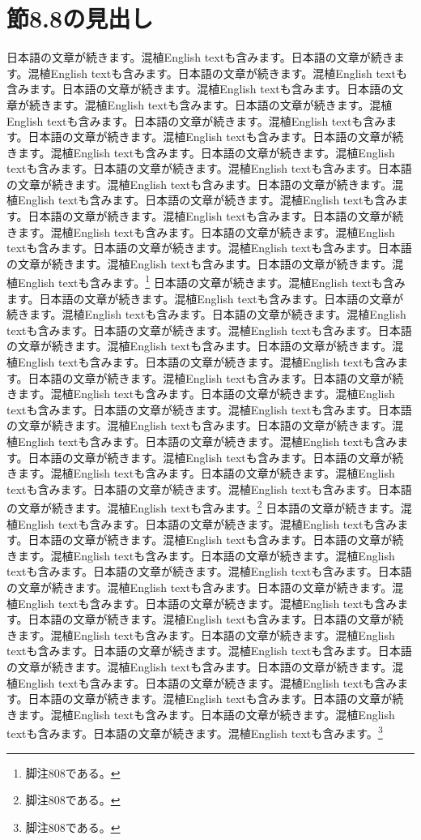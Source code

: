 \documentclass[pdflatex,book]{jlreq}
\begin{document}
\section{節8.8の見出し}
日本語の文章が続きます。混植English textも含みます。日本語の文章が続きます。混植English textも含みます。日本語の文章が続きます。混植English textも含みます。日本語の文章が続きます。混植English textも含みます。日本語の文章が続きます。混植English textも含みます。日本語の文章が続きます。混植English textも含みます。日本語の文章が続きます。混植English textも含みます。日本語の文章が続きます。混植English textも含みます。日本語の文章が続きます。混植English textも含みます。日本語の文章が続きます。混植English textも含みます。日本語の文章が続きます。混植English textも含みます。日本語の文章が続きます。混植English textも含みます。日本語の文章が続きます。混植English textも含みます。日本語の文章が続きます。混植English textも含みます。日本語の文章が続きます。混植English textも含みます。日本語の文章が続きます。混植English textも含みます。日本語の文章が続きます。混植English textも含みます。日本語の文章が続きます。混植English textも含みます。日本語の文章が続きます。混植English textも含みます。日本語の文章が続きます。混植English textも含みます。\footnote{脚注808である。}
日本語の文章が続きます。混植English textも含みます。日本語の文章が続きます。混植English textも含みます。日本語の文章が続きます。混植English textも含みます。日本語の文章が続きます。混植English textも含みます。日本語の文章が続きます。混植English textも含みます。日本語の文章が続きます。混植English textも含みます。日本語の文章が続きます。混植English textも含みます。日本語の文章が続きます。混植English textも含みます。日本語の文章が続きます。混植English textも含みます。日本語の文章が続きます。混植English textも含みます。日本語の文章が続きます。混植English textも含みます。日本語の文章が続きます。混植English textも含みます。日本語の文章が続きます。混植English textも含みます。日本語の文章が続きます。混植English textも含みます。日本語の文章が続きます。混植English textも含みます。日本語の文章が続きます。混植English textも含みます。日本語の文章が続きます。混植English textも含みます。日本語の文章が続きます。混植English textも含みます。日本語の文章が続きます。混植English textも含みます。日本語の文章が続きます。混植English textも含みます。\footnote{脚注808である。}
日本語の文章が続きます。混植English textも含みます。日本語の文章が続きます。混植English textも含みます。日本語の文章が続きます。混植English textも含みます。日本語の文章が続きます。混植English textも含みます。日本語の文章が続きます。混植English textも含みます。日本語の文章が続きます。混植English textも含みます。日本語の文章が続きます。混植English textも含みます。日本語の文章が続きます。混植English textも含みます。日本語の文章が続きます。混植English textも含みます。日本語の文章が続きます。混植English textも含みます。日本語の文章が続きます。混植English textも含みます。日本語の文章が続きます。混植English textも含みます。日本語の文章が続きます。混植English textも含みます。日本語の文章が続きます。混植English textも含みます。日本語の文章が続きます。混植English textも含みます。日本語の文章が続きます。混植English textも含みます。日本語の文章が続きます。混植English textも含みます。日本語の文章が続きます。混植English textも含みます。日本語の文章が続きます。混植English textも含みます。日本語の文章が続きます。混植English textも含みます。\footnote{脚注808である。}
\end{document}
